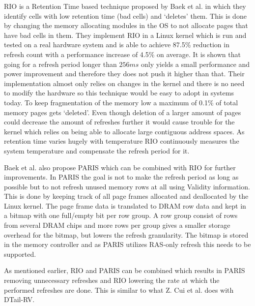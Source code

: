 RIO is a Retention Time based technique proposed by Baek et al. \cite{rioparis} in which they identify cells with low retention time (bad cells) and `deletes' them. This is done by changing the memory allocating modules in the OS to not allocate pages that have bad cells in them. They implement RIO in a Linux kernel which is run and tested on a real hardware system and is able to achieve 87.5\% reduction in refresh count with a performance increase of 4.5\% on average. It is shown that going for a refresh period longer than \(256ms\) only yields a small performance and power improvement and therefore they does not push it higher than that. Their implementation almost only relies on changes in the kernel and there is no need to modify the hardware so this technique would be easy to adopt in systems today. To keep fragmentation of the memory low a maximum of 0.1\% of total memory pages gets `deleted'. Even though deletion of a larger amount of pages could decrease the amount of refreshes further it would cause trouble for the kernel which relies on being able to allocate large contiguous address spaces. As retention time varies hugely with temperature RIO continuously measures the system temperature and compensate the refresh period for it. 

Baek et al. also propose PARIS \cite{rioparis} which can be combined with RIO for further improvements. In PARIS the goal is not to make the refresh period as long as possible but to not refresh unused memory rows at all using Validity information. This is done by keeping track of all page frames allocated and deallocated by the Linux kernel. The page frame data is translated to DRAM row data and kept in a bitmap with one full/empty bit per row group. A row group consist of rows from several DRAM chips and more rows per group gives a smaller storage overhead for the bitmap, but lowers the refresh granularity. The bitmap is stored in the memory controller and as PARIS utilizes RAS-only refresh this needs to be supported. 

As mentioned earlier, RIO and PARIS can be combined which results in PARIS removing unnecessary refreshes and RIO lowering the rate at which the performed refreshes are done. This is similar to what Z. Cui et al. does with DTail-RV. 